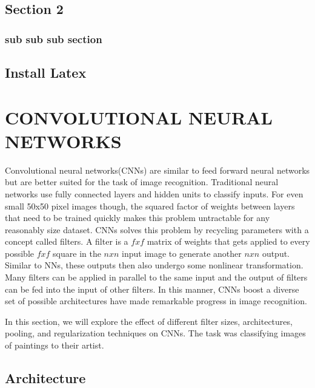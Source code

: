 \documentclass[10pt,twoside]{article}
\begin{document}
\subsection{Section 2}


\subsubsection{sub sub sub section}


\subsection{Install Latex}


\section{\uppercase{Convolutional Neural Networks}}

\noindent Convolutional neural networks(CNNs) are similar to feed forward neural networks but are better suited for the task of image recognition. Traditional neural networks use fully connected layers and hidden units to classify inputs. For even small 50x50 pixel images though, the squared factor of weights between layers that need to be trained quickly makes this problem untractable for any reasonably size dataset.  CNNs solves this problem by recycling parameters with a concept called filters. A filter is a $fxf$ matrix of weights that gets applied to every possible $fxf$ square in the $nxn$ input image to generate another $nxn$ output. Similar to NNs, these outputs then also undergo some nonlinear transformation. Many filters can be applied in parallel to the same input and the output of filters can be fed into the input of other filters. In this manner, CNNs boost a diverse set of possible architectures have made remarkable progress in image recognition.

In this section, we will explore the effect of different filter sizes, architectures, pooling, and regularization techniques on CNNs. The task was classifying images of paintings to their artist.

\subsection{Architecture}
\end{document}
